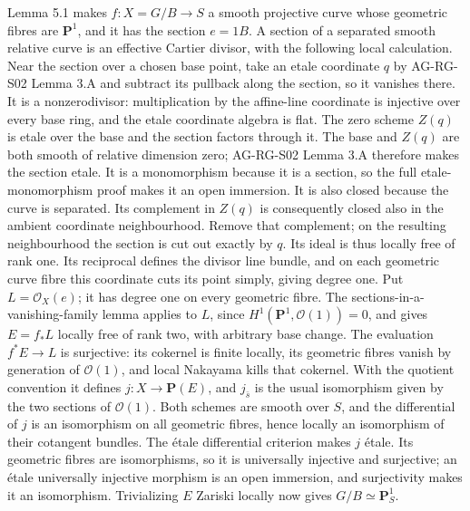 \documentclass[11pt,a4paper,openany]{report}
\begin{document}
Lemma 5.1 makes \(f:X=G/B\to S\) a smooth projective curve whose geometric fibres are \(\mathbf P^1\), and it has the section \(e=1B\). A section of a separated smooth relative curve is an effective Cartier divisor, with the following local calculation. Near the section over a chosen base point, take an etale coordinate \(q\) by AG-RG-S02 Lemma 3.A and subtract its pullback along the section, so it vanishes there. It is a nonzerodivisor: multiplication by the affine-line coordinate is injective over every base ring, and the etale coordinate algebra is flat. The zero scheme \(Z(q)\) is etale over the base and the section factors through it. The base and \(Z(q)\) are both smooth of relative dimension zero; AG-RG-S02 Lemma 3.A therefore makes the section etale. It is a monomorphism because it is a section, so the full etale-monomorphism proof makes it an open immersion. It is also closed because the curve is separated. Its complement in \(Z(q)\) is consequently closed also in the ambient coordinate neighbourhood. Remove that complement; on the resulting neighbourhood the section is cut out exactly by \(q\). Its ideal is thus locally free of rank one. Its reciprocal defines the divisor line bundle, and on each geometric curve fibre this coordinate cuts its point simply, giving degree one. Put \(L=\mathcal O_X(e)\); it has degree one on every geometric fibre. The sections-in-a-vanishing-family lemma applies to \(L\), since \(H^1(\mathbf P^1,\mathcal O(1))=0\), and gives \(E=f_*L\) locally free of rank two, with arbitrary base change. The evaluation \(f^*E\to L\) is surjective: its cokernel is finite locally, its geometric fibres vanish by generation of \(\mathcal O(1)\), and local Nakayama kills that cokernel. With the quotient convention it defines \(j:X\to\mathbf P(E)\), and \(j_{\bar s}\) is the usual isomorphism given by the two sections of \(\mathcal O(1)\). Both schemes are smooth over \(S\), and the differential of \(j\) is an isomorphism on all geometric fibres, hence locally an isomorphism of their cotangent bundles. The étale differential criterion makes \(j\) étale. Its geometric fibres are isomorphisms, so it is universally injective and surjective; an étale universally injective morphism is an open immersion, and surjectivity makes it an isomorphism. Trivializing \(E\) Zariski locally now gives \(G/B\simeq\mathbf P^1_S\).
\end{document}

